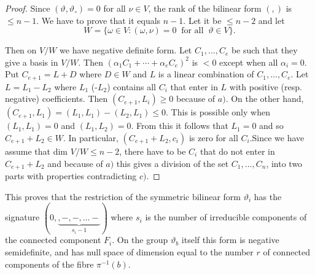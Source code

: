 \begin{proof}
Since $(\vartheta,\vartheta_\circ)=0$ for all $\nu \in V$, the rank of
the bilinear form $(,)$ is $\leq n-1$. We have to prove that it equals
$n-1$. Let  it be $\leq n-2$ and let 
$$
W=\bigg\{ \omega \in V: (\omega,\nu)=0 ~\text{ for all }~  \vartheta
\in V\bigg\}. 
$$ 

Then on $V/W$ we have negative definite form. Let $C_1,\ldots,C_e$ be
such that they give a basis in 
$V/W$. Then $(\alpha_1C_1+\cdots+ \alpha_e C_e)^2$ is $< 0$ except when all
$\alpha_i = 0$. Put $C_{e+1} = L + D$ where $D \in W$ and $L$ is a
linear combination of $C_1,\ldots,C_e$. Let $L=L_1-L_2$ where $L_1$
(\resp -$L_2$) contains all $C_i$ that enter in $L$ with positive
(resp. negative) coefficients. Then $(C_{e+1},L_i)\geq 0$ because of
$a)$. On the other hand, $(C_{e+1},L_1)=(L_1,L_1)-(L_2,L_1)\leq 0$. This
is possible only when $(L_1,L_1)=0$ and $(L_1,L_2)=0$. From this it
follows that $L_1=0$ and so $C_{e+1}+L_2\in W$. In particular,
$(C_{e+1}+L_2,c_i)$ is zero for all $C_i$.\pageoriginale Since we have
assume that 
dim $V/W\leq n-2$, there have to be $C_i$ that do not enter in
$C_{e+1} + L_2$ and because of $a)$ this gives a division of the set
$C_1,\ldots, C_n$, into two parts with properties contradicting $c)$. 
\end{proof}

This proves that the restriction of the symmetric bilinear form
$\vartheta_i$ has the signature $(0, \underbrace{,-,-,\ldots-}_{s_i-1})$
where $s_i$ is the number of irreducible components of the connected
component $F_i$. On the group $\vartheta_b$ itself this form is
negative semidefinite, and has null space of dimension equal to the
number $r$ of connected components of the fibre $\pi^{-1}(b)$. 

